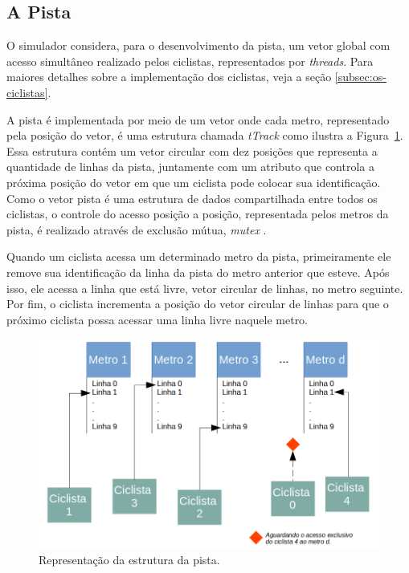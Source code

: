 \documentclass[12pt]{article}
\begin{document}
\subsection{A Pista}

O simulador considera, para o desenvolvimento da pista, um vetor global com acesso simultâneo realizado pelos ciclistas, representados por \textit{threads}. Para maiores detalhes sobre a implementação dos ciclistas, veja a seção \ref{subsec:os-ciclistas}.

A pista é implementada por meio de um vetor onde cada metro, representado pela posição do vetor, é uma estrutura chamada \textit{tTrack} como ilustra a Figura~\ref{fig:track}. Essa estrutura contém um vetor circular com dez posições que representa a quantidade de linhas da pista, juntamente com um atributo que controla a próxima posição do vetor em que um ciclista pode colocar sua identificação. Como o vetor pista é uma estrutura de dados compartilhada entre todos os ciclistas, o controle do acesso posição a posição, representada pelos metros da pista, é realizado através de exclusão mútua, \textit{mutex} \cite{robbins:00}.

Quando um ciclista acessa um determinado metro da pista, primeiramente ele remove sua identificação da linha da pista do metro anterior que esteve. Após isso, ele acessa a linha que está livre, vetor circular de linhas, no metro seguinte. Por fim, o ciclista incrementa a posição do vetor circular de linhas para que o próximo ciclista possa acessar uma linha livre naquele metro.

\begin{figure}[H]
	\centering
	\includegraphics[width=.9\textwidth]{track.png}
	\caption{Representação da estrutura da pista.}
	\label{fig:track}
\end{figure}
\end{document}
